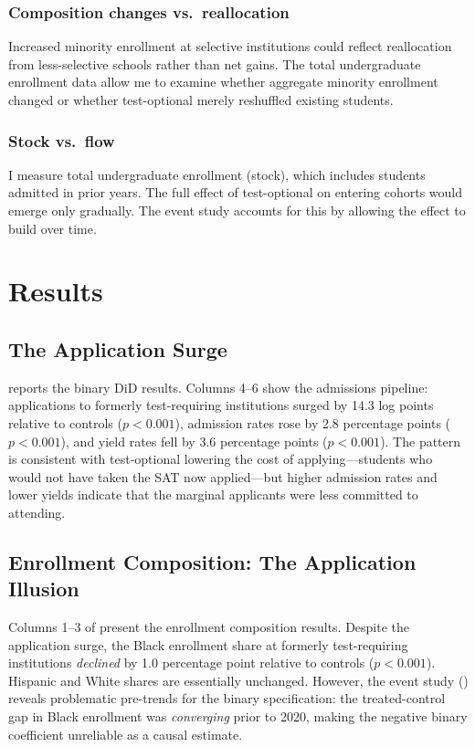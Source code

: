 \documentclass[12pt]{article}
\begin{document}
\subsubsection*{Composition changes vs.\ reallocation} Increased minority enrollment at selective institutions could reflect reallocation from less-selective schools rather than net gains. The total undergraduate enrollment data allow me to examine whether aggregate minority enrollment changed or whether test-optional merely reshuffled existing students.

\subsubsection*{Stock vs.\ flow} I measure total undergraduate enrollment (stock), which includes students admitted in prior years. The full effect of test-optional on entering cohorts would emerge only gradually. The event study accounts for this by allowing the effect to build over time.


\section{Results}
\label{sec:results}

\subsection{The Application Surge}

 reports the binary DiD results. Columns 4--6 show the admissions pipeline: applications to formerly test-requiring institutions surged by 14.3 log points relative to controls ($p < 0.001$), admission rates rose by 2.8 percentage points ($p < 0.001$), and yield rates fell by 3.6 percentage points ($p < 0.001$). The pattern is consistent with test-optional lowering the cost of applying---students who would not have taken the SAT now applied---but higher admission rates and lower yields indicate that the marginal applicants were less committed to attending.



\subsection{Enrollment Composition: The Application Illusion}

Columns 1--3 of  present the enrollment composition results. Despite the application surge, the Black enrollment share at formerly test-requiring institutions \textit{declined} by 1.0 percentage point relative to controls ($p < 0.001$). Hispanic and White shares are essentially unchanged. However, the event study () reveals problematic pre-trends for the binary specification: the treated-control gap in Black enrollment was \textit{converging} prior to 2020, making the negative binary coefficient unreliable as a causal estimate.
\end{document}
